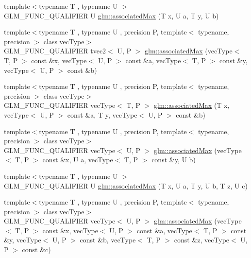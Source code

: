 \begin{DoxyCompactItemize}
\item 
{\footnotesize template$<$typename T , typename U $>$ }\\G\-L\-M\-\_\-\-F\-U\-N\-C\-\_\-\-Q\-U\-A\-L\-I\-F\-I\-E\-R U \hyperlink{group__gtx__associated__min__max_ga7d9c8785230c8db60f72ec8975f1ba45}{glm\-::associated\-Max} (T x, U a, T y, U b)
\item 
{\footnotesize template$<$typename T , typename U , precision P, template$<$ typename, precision $>$ class vec\-Type$>$ }\\G\-L\-M\-\_\-\-F\-U\-N\-C\-\_\-\-Q\-U\-A\-L\-I\-F\-I\-E\-R tvec2$<$ U, P $>$ \hyperlink{group__gtx__associated__min__max_ga10ba6001798f42a0f941f19ff30e066a}{glm\-::associated\-Max} (vec\-Type$<$ T, P $>$ const \&x, vec\-Type$<$ U, P $>$ const \&a, vec\-Type$<$ T, P $>$ const \&y, vec\-Type$<$ U, P $>$ const \&b)
\item 
{\footnotesize template$<$typename T , typename U , precision P, template$<$ typename, precision $>$ class vec\-Type$>$ }\\G\-L\-M\-\_\-\-F\-U\-N\-C\-\_\-\-Q\-U\-A\-L\-I\-F\-I\-E\-R vec\-Type$<$ T, P $>$ \hyperlink{group__gtx__associated__min__max_ga62ca63cca6b21387b8a25474f441a869}{glm\-::associated\-Max} (T x, vec\-Type$<$ U, P $>$ const \&a, T y, vec\-Type$<$ U, P $>$ const \&b)
\item 
{\footnotesize template$<$typename T , typename U , precision P, template$<$ typename, precision $>$ class vec\-Type$>$ }\\G\-L\-M\-\_\-\-F\-U\-N\-C\-\_\-\-Q\-U\-A\-L\-I\-F\-I\-E\-R vec\-Type$<$ U, P $>$ \hyperlink{group__gtx__associated__min__max_ga5364520173815b66a9d9e452c38bf312}{glm\-::associated\-Max} (vec\-Type$<$ T, P $>$ const \&x, U a, vec\-Type$<$ T, P $>$ const \&y, U b)
\item 
{\footnotesize template$<$typename T , typename U $>$ }\\G\-L\-M\-\_\-\-F\-U\-N\-C\-\_\-\-Q\-U\-A\-L\-I\-F\-I\-E\-R U \hyperlink{group__gtx__associated__min__max_gaec891e363d91abbf3a4443cf2f652209}{glm\-::associated\-Max} (T x, U a, T y, U b, T z, U c)
\item 
{\footnotesize template$<$typename T , typename U , precision P, template$<$ typename, precision $>$ class vec\-Type$>$ }\\G\-L\-M\-\_\-\-F\-U\-N\-C\-\_\-\-Q\-U\-A\-L\-I\-F\-I\-E\-R vec\-Type$<$ U, P $>$ \hyperlink{group__gtx__associated__min__max_ga065a0c1eb7837118ef79be88dfd78487}{glm\-::associated\-Max} (vec\-Type$<$ T, P $>$ const \&x, vec\-Type$<$ U, P $>$ const \&a, vec\-Type$<$ T, P $>$ const \&y, vec\-Type$<$ U, P $>$ const \&b, vec\-Type$<$ T, P $>$ const \&z, vec\-Type$<$ U, P $>$ const \&c)

\end{DoxyCompactItemize}
